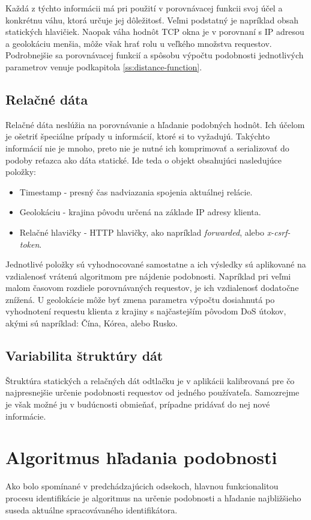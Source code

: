 \documentclass[
  digital, %
  table,   %
  lof,     %
  nolot,   %
  nocover
]{fithesis3}
\begin{document}
Každá z týchto informácii má pri použití v porovnávacej funkcii svoj účel a
konkrétnu váhu, ktorá určuje jej dôležitosť. Veľmi podstatný je napríklad obsah statických hlavičiek. Naopak
váha hodnôt TCP okna je v porovnaní s IP adresou a geolokáciu menšia, môže však
hrať rolu u veľkého množstva requestov. Podrobnejšie sa porovnávacej funkcií a
spôsobu výpočtu podobnosti jednotlivých parametrov venuje podkapitola \ref{ss:distance-function}.

\subsection{Relačné dáta}
Relačné dáta neslúžia na porovnávanie a hľadanie podobných hodnôt. Ich účelom
je ošetriť špeciálne prípady u informácií, ktoré si to vyžadujú. Takýchto
informácií nie je mnoho, preto nie je nutné ich komprimovať a serializovať do podoby reťazca ako
dáta statické.
Ide teda o objekt obsahujúci nasledujúce položky:
\begin{itemize}
    \item Timestamp - presný čas nadviazania spojenia aktuálnej relácie.
    \item Geolokáciu - krajina pôvodu určená na základe IP adresy klienta.
    \item Relačné hlavičky - HTTP hlavičky, ako napríklad
    \textit{forwarded}, alebo \textit{x-csrf-token}. 
\end{itemize}

Jednotlivé položky sú vyhodnocované samostatne a ich výsledky sú aplikované na
vzdialenosť vrátenú algoritmom pre nájdenie podobnosti. Napríklad pri veľmi
malom časovom rozdiele porovnávaných requestov, je ich vzdialenosť dodatočne
znížená. U geolokácie môže byť zmena parametra výpočtu dosiahnutá po vyhodnotení requestu
klienta z krajiny s najčastejším pôvodom DoS útokov, akými sú napríklad: Čína,
Kórea, alebo Rusko.

\subsection{Variabilita štruktúry dát}
Štruktúra statických a relačných dát odtlačku je v aplikácii kalibrovaná
pre čo najpresnejšie určenie podobnosti requestov od jedného používateľa.
Samozrejme je však možné ju v budúcnosti obmieňať, prípadne pridávať do nej
nové informácie.

\section{Algoritmus hľadania podobnosti}
\label{s:similarity-search}
Ako bolo spomínané v predchádzajúcich odsekoch, hlavnou funkcionalitou procesu identifikácie je
algoritmus na určenie podobnosti a hľadanie najbližšieho suseda aktuálne
spracovávaného identifikátora. 
\end{document}
